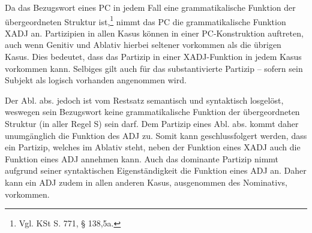 \documentclass[12pt,a4paper]{article}
\begin{document}
Da das Bezugswort eines PC in jedem Fall eine grammatikalische Funktion der übergeordneten Struktur ist,\footnote{Vgl. KSt S. 771, § 138,5a.} nimmt das PC die grammatikalische Funktion XADJ an. Partizipien in allen Kasus können in einer PC-Konstruktion auftreten, auch wenn Genitiv und Ablativ hierbei seltener vorkommen als die übrigen Kasus. Dies bedeutet, dass das Partizip in einer XADJ-Funktion in jedem Kasus vorkommen kann. Selbiges gilt auch für das substantivierte Partizip -- sofern sein Subjekt als logisch vorhanden angenommen wird.

Der Abl. abs. jedoch ist vom Restsatz semantisch und syntaktisch losgelöst, weswegen sein Bezugswort keine grammatikalische Funktion der übergeordneten Struktur (in aller Regel S) sein darf. Dem Partizip eines Abl. abs. kommt daher unumgänglich die Funktion des ADJ zu. Somit kann geschlussfolgert werden, dass ein Partizip, welches im Ablativ steht, neben der Funktion eines XADJ auch die Funktion eines ADJ annehmen kann. Auch das dominante Partizip nimmt aufgrund seiner syntaktischen Eigenständigkeit die Funktion eines ADJ an. Daher kann ein ADJ zudem in allen anderen Kasus, ausgenommen des Nominativs, vorkommen.
\end{document}
